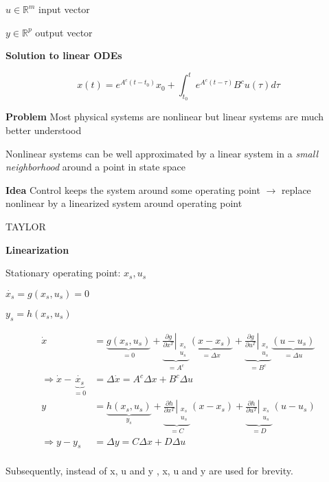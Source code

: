$u \in \mathbb{R}^m$
input vector

$y \in \mathbb{R}^p$
output vector

\textbf{Solution to linear ODEs}

$$
	x(t) = e^{A^c(t-t_0)}x_0 + \int_{t_0}^{t}e^{A^c(t-\tau)}B^c u(\tau)d\tau
$$

\textbf{Problem}
Most physical systems are nonlinear
but linear systems are much better understood

Nonlinear systems can be well approximated by a linear system
in a \textit{small neighborhood} around a point in state space

\textbf{Idea}
Control keeps the system around some operating point
$\rightarrow$
replace nonlinear by a linearized system around operating point

TAYLOR %

\textbf{Linearization}

Stationary operating point:
$x_s,u_s$

$\dot{x_s} = g(x_s,u_s)=0$

$y_s = h(x_s,u_s)$

$$\begin{aligned}
		\dot{x} & =
		\underbrace{
			g(x_s,u_s)
		}_{=0}
		+
		\underbrace{
		\left.\frac{\partial g}{\partial x^T}\right|_{\substack{x_s \\u_s}}
		}_{=A^c}
		\underbrace{
			(x-x_s)
		}_{=\Delta x}
		+
		\underbrace{
		\left.\frac{\partial g}{\partial u^T}\right|_{\substack{x_s \\u_s}}
		}_{=B^c}
		\underbrace{
			(u-u_s)
		}_{=\Delta u}
		\\
		\Rightarrow
		\dot{x} -
		\underbrace{
			\dot{x_s}
		}_{=0}
		        & = \Delta \dot{x}
		= A^c\Delta x + B^c\Delta u
		\\
		y       & =
		\underbrace{
			h(x_s,u_s)
		}_{y_s}
		+
		\underbrace{
		\left.\frac{\partial h}{\partial x^T}\right|_{\substack{x_s \\u_s}}
		}_{=C}
		(x-x_s)
		+
		\underbrace{
		\left.\frac{\partial h}{\partial u^T}\right|_{\substack{x_s \\u_s}}
		}_{=D}
		(u-u_s)
		\\
		\Rightarrow
		y - y_s & = \Delta y
		= C\Delta x + D\Delta u
		\\
	\end{aligned}$$

Subsequently, instead of \Delta x, \Delta u and \Delta y , x, u and y are used for brevity.

